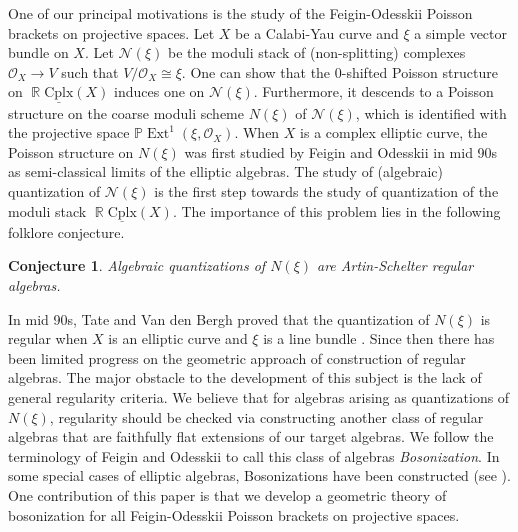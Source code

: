 \documentclass[reqno]{amsart}
\DeclareMathOperator\R{\mathbb R}
\newtheorem{conj}[theorem]{Conjecture}
\theoremstyle{definition}
\theoremstyle{remark}
\renewcommand{\P}{{\mathbb P}}
\newcommand{\ul}{\underline}
\newcommand{\Ext}{\operatorname{Ext}}
\newcommand{\cplx}{{\mathrm{Cplx}}}
\newcommand{\cO}{\mathcal{O}}
\newcommand{\sN}{\mathscr{N}}
\numberwithin{equation}{section}
\begin{document}
One of our principal motivations is the study of the Feigin-Odesskii Poisson brackets on projective spaces. Let $X$ be a Calabi-Yau curve and $\xi$ a simple vector bundle on $X$. Let $\sN(\xi)$ be the moduli stack of (non-splitting) complexes $\cO_X\to V$ such that $V/\cO_X\cong \xi$. One can show that the $0$-shifted Poisson structure on $\R\ul\cplx(X)$ induces one on $\sN(\xi)$.
Furthermore, it descends to a Poisson structure on the coarse moduli scheme $N(\xi)$ of $\sN(\xi)$, which is identified with the projective space $\P\Ext^1(\xi,\cO_X)$. 
When $X$ is a complex elliptic curve, the Poisson structure on $N(\xi)$ was first studied by Feigin and Odesskii in mid 90s as semi-classical limits of the elliptic algebras. The study of (algebraic) quantization of $\sN(\xi)$ is the first step towards the study of quantization of the moduli stack $\R\ul\cplx(X)$.  The importance of this problem lies in the following folklore conjecture.
\begin{conj}
Algebraic quantizations of $N(\xi)$ are Artin-Schelter regular algebras.
\end{conj}
In mid 90s, Tate and Van den Bergh proved that the quantization of $N(\xi)$ is regular when $X$ is an elliptic curve and $\xi$ is a line bundle \cite{TV96}. Since then there has been limited progress on the geometric approach of construction of regular algebras. The major obstacle to the development of this subject is the lack of general regularity criteria. We believe that for algebras arising as quantizations of $N(\xi)$, regularity should be checked via constructing another class of regular algebras that are faithfully flat extensions of our target algebras. We follow the terminology of Feigin and Odesskii to call this class of algebras \emph{Bosonization}. In some special cases of elliptic algebras, Bosonizations have been constructed (see \cite{Ode02, TV96}). One contribution of this paper is that we develop a geometric theory of bosonization for all Feigin-Odesskii Poisson brackets on projective spaces.
\end{document}
